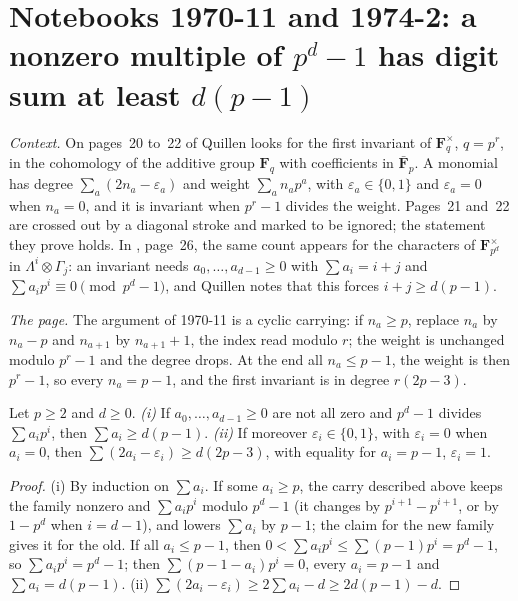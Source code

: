 \section[Notebooks 1970-11 and 1974-2: the digit-sum bound]{Notebooks 1970-11 and 1974-2: a nonzero multiple of $p^d - 1$ has digit sum at least $d(p-1)$\protect{}}\label{sec:quillen-1970-11-digits}

\emph{Context.} On pages~20 to~22 of  Quillen looks for the first invariant of $\mathbf F_q^\times$, $q = p^r$, in the cohomology of the additive group $\mathbf F_q$ with coefficients in $\bar{\mathbf F}_p$. A monomial has degree $\sum_a (2n_a - \varepsilon_a)$ and weight $\sum_a n_ap^a$, with $\varepsilon_a \in \{0, 1\}$ and $\varepsilon_a = 0$ when $n_a = 0$, and it is invariant when $p^r - 1$ divides the weight. Pages~21 and~22 are crossed out by a diagonal stroke and marked to be ignored; the statement they prove holds. In , page~26, the same count appears for the characters of $\mathbf F_{p^d}^\times$ in $\Lambda^i \otimes \Gamma_j$: an invariant needs $a_0, \ldots, a_{d-1} \ge 0$ with $\sum a_i = i + j$ and $\sum a_ip^i \equiv 0 \pmod{p^d - 1}$, and Quillen notes that this forces $i + j \ge d(p-1)$.

\emph{The page.} The argument of 1970-11 is a cyclic carrying: if $n_a \ge p$, replace $n_a$ by $n_a - p$ and $n_{a+1}$ by $n_{a+1} + 1$, the index read modulo $r$; the weight is unchanged modulo $p^r - 1$ and the degree drops. At the end all $n_a \le p - 1$, the weight is then $p^r - 1$, so every $n_a = p - 1$, and the first invariant is in degree $r(2p - 3)$.

\begin{encadre}
\begin{theoreme}\label{thm:quillen-1970-11-digits}
Let $p \ge 2$ and $d \ge 0$. \emph{(i)} If $a_0, \ldots, a_{d-1} \ge 0$ are not all zero and $p^d - 1$ divides $\sum a_ip^i$, then $\sum a_i \ge d(p - 1)$. \emph{(ii)} If moreover $\varepsilon_i \in \{0, 1\}$, with $\varepsilon_i = 0$ when $a_i = 0$, then $\sum (2a_i - \varepsilon_i) \ge d(2p - 3)$, with equality for $a_i = p - 1$, $\varepsilon_i = 1$.
\end{theoreme}
\end{encadre}

\begin{proof}
(i) By induction on $\sum a_i$. If some $a_i \ge p$, the carry described above keeps the family nonzero and $\sum a_ip^i$ modulo $p^d - 1$ (it changes by $p^{i+1} - p^{i+1}$, or by $1 - p^d$ when $i = d - 1$), and lowers $\sum a_i$ by $p - 1$; the claim for the new family gives it for the old. If all $a_i \le p - 1$, then $0 < \sum a_ip^i \le \sum (p-1)p^i = p^d - 1$, so $\sum a_ip^i = p^d - 1$; then $\sum (p - 1 - a_i)p^i = 0$, every $a_i = p - 1$ and $\sum a_i = d(p-1)$. (ii) $\sum(2a_i - \varepsilon_i) \ge 2\sum a_i - d \ge 2d(p-1) - d$.
\end{proof}


